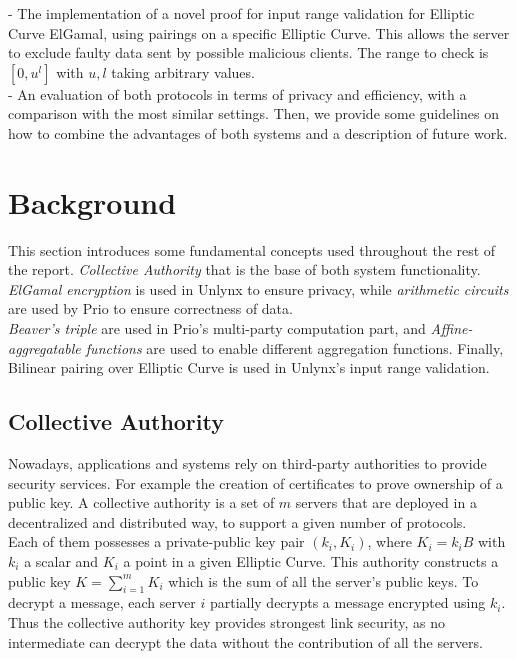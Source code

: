 \documentclass{article}
\begin{document}
- The implementation of a novel proof for input range validation for Elliptic Curve ElGamal, using pairings on a specific Elliptic Curve. This allows the server to exclude faulty data sent by possible malicious clients. The range to check is $[0,u^l]$ with $u,l$ taking arbitrary values.\\

- An evaluation of both protocols in terms of privacy and efficiency, with a comparison with the most similar settings. Then, we provide some guidelines on how to  combine the advantages of both systems and a description of future work.


\section*{Background}
This section introduces some fundamental concepts used throughout the rest of the report. \textit{Collective Authority} that is the base of both system functionality. \textit{ElGamal encryption} is used in Unlynx to ensure privacy, while \textit{arithmetic circuits} are used by Prio to ensure correctness of data.\\
\textit{Beaver's triple} are used in Prio's multi-party computation part, and \textit{Affine-aggregatable functions} are used to enable different aggregation functions. 
Finally, Bilinear pairing over Elliptic Curve is used in Unlynx's input range validation.\\

\subsection*{Collective Authority}
Nowadays, applications and systems rely on third-party authorities to provide security services. For example the creation of certificates to prove ownership of a public key. A collective authority is a set of $m$  servers that are deployed in a decentralized and distributed way, to support a given number of protocols.\\
Each of them possesses a private-public key pair $(k_i,K_i)$, where $K_i = k_i B$ with $k_i$ a scalar and $K_i$ a point in a given Elliptic Curve. This authority constructs a public key $K = \sum_{i=1}^{m}{K_i}$ which is the sum of all the server's public keys. To decrypt a message, each server $i$ partially decrypts a message encrypted using $k_{i}$. Thus the collective authority key provides strongest link security, as no intermediate can decrypt the data without the contribution of all the servers.
\end{document}
